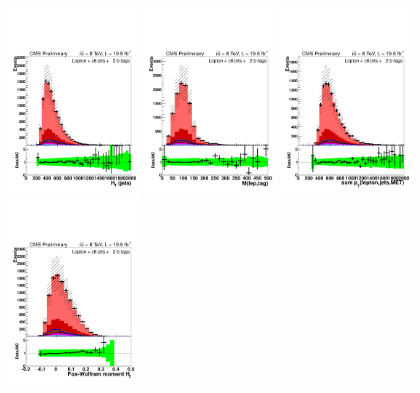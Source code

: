 \begin{figure}[hbtp]
 \begin{center}
   \includegraphics[width=0.31\textwidth]{Figures/Analysis_2_Diagrams/LJ_plots_lep/6j2t/lep_HT_6j2t_cumulative_wRatio_noLegend_lin.pdf}
   \includegraphics[width=0.31\textwidth]{Figures/Analysis_2_Diagrams/LJ_plots_lep/6j2t/lep_Mlb_6j2t_cumulative_wRatio_noLegend_lin.pdf}
   \includegraphics[width=0.31\textwidth]{Figures/Analysis_2_Diagrams/LJ_plots_lep/6j2t/lep_all_sum_pt_with_met_6j2t_cumulative_wRatio_noLegend_lin.pdf}
   \includegraphics[width=0.31\textwidth]{Figures/Analysis_2_Diagrams/LJ_plots_lep/6j2t/lep_h2_6j2t_cumulative_wRatio_noLegend_lin.pdf}

\end{center}
\end{figure}
